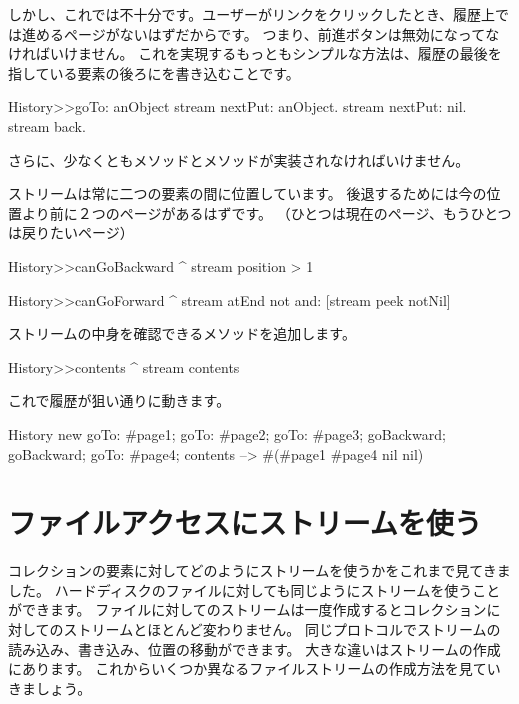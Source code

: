 \documentclass[a4paper,10pt,twoside]{book}
\begin{document}
しかし、これでは不十分です。ユーザーがリンクをクリックしたとき、履歴上では進めるページがないはずだからです。
つまり、前進ボタンは無効になってなければいけません。
これを実現するもっともシンプルな方法は、履歴の最後を指している要素の後ろにを書き込むことです。


\begin{code}{}
History>>goTo: anObject
  stream nextPut: anObject.
  stream nextPut: nil.
  stream back.
\end{code}

さらに、少なくともメソッドとメソッドが実装されなければいけません。

ストリームは常に二つの要素の間に位置しています。
後退するためには今の位置より前に２つのページがあるはずです。
（ひとつは現在のページ、もうひとつは戻りたいページ）

\begin{code}{}
History>>canGoBackward
  ^ stream position > 1

History>>canGoForward
  ^ stream atEnd not and: [stream peek notNil]
\end{code}

ストリームの中身を確認できるメソッドを追加します。

\begin{code}{}
History>>contents
  ^ stream contents
\end{code}

これで履歴が狙い通りに動きます。

\begin{code}{}
History new
	goTo: #page1;
	goTo: #page2;
	goTo: #page3;
	goBackward;
	goBackward;
	goTo: #page4;
	contents --> #(#page1 #page4 nil nil)
\end{code}

\section{ファイルアクセスにストリームを使う}

コレクションの要素に対してどのようにストリームを使うかをこれまで見てきました。
ハードディスクのファイルに対しても同じようにストリームを使うことができます。
ファイルに対してのストリームは一度作成するとコレクションに対してのストリームとほとんど変わりません。
同じプロトコルでストリームの読み込み、書き込み、位置の移動ができます。
大きな違いはストリームの作成にあります。
これからいくつか異なるファイルストリームの作成方法を見ていきましょう。
\end{document}

